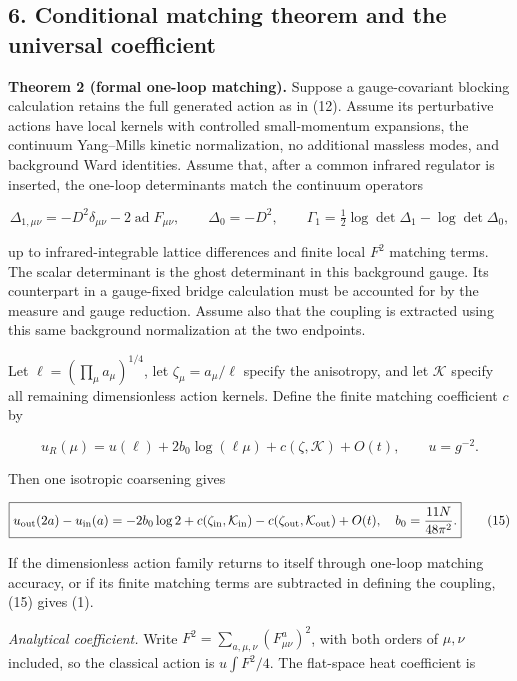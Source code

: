 \documentclass[11pt,a4paper]{article}
\begin{document}
\hypertarget{conditional-matching-theorem-and-the-universal-coefficient}{%
\subsection{6. Conditional matching theorem and the universal
coefficient}\label{conditional-matching-theorem-and-the-universal-coefficient}}

\textbf{Theorem 2 (formal one-loop matching).} Suppose a gauge-covariant
blocking calculation retains the full generated action as in (12).
Assume its perturbative actions have local kernels with controlled
small-momentum expansions, the continuum Yang--Mills kinetic
normalization, no additional massless modes, and background Ward
identities. Assume that, after a common infrared regulator is inserted,
the one-loop determinants match the continuum operators

\[\Delta_{1,\mu\nu}=-D^2\delta_{\mu\nu}-2\operatorname{ad}F_{\mu\nu},
 \qquad \Delta_0=-D^2,\qquad
 \Gamma_1=\tfrac12\log\det\Delta_1-\log\det\Delta_0,
\tag{14}\]

up to infrared-integrable lattice differences and finite local \(F^2\)
matching terms. The scalar determinant is the ghost determinant in this
background gauge. Its counterpart in a gauge-fixed bridge calculation
must be accounted for by the measure and gauge reduction. Assume also
that the coupling is extracted using this same background normalization
at the two endpoints.

Let \(\ell=(\prod_\mu a_\mu)^{1/4}\), let \(\zeta_\mu=a_\mu/\ell\)
specify the anisotropy, and let \(\mathcal K\) specify all remaining
dimensionless action kernels. Define the finite matching coefficient
\(c\) by

\[u_R(\mu)=u(\ell)+2b_0\log(\ell\mu)
              +c(\zeta,\mathcal K)+O(t),\qquad u=g^{-2}.\]

Then one isotropic coarsening gives

\[\boxed{u_{\rm out}(2a)-u_{\rm in}(a)
 =-2b_0\log2+c(\zeta_{\rm in},\mathcal K_{\rm in})
                 -c(\zeta_{\rm out},\mathcal K_{\rm out})+O(t),
 \quad b_0=\frac{11N}{48\pi^2}.}\tag{15}\]

If the dimensionless action family returns to itself through one-loop
matching accuracy, or if its finite matching terms are subtracted in
defining the coupling, (15) gives (1).

\emph{Analytical coefficient.} Write
\(F^2=\sum_{a,\mu,\nu}(F^a_{\mu\nu})^2\), with both orders of
\(\mu,\nu\) included, so the classical action is \(u\int F^2/4\). The
flat-space heat coefficient is
\end{document}

